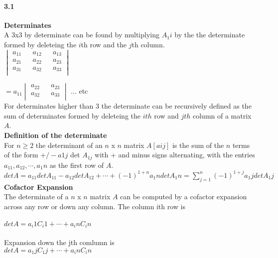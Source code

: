 \documentclass[14pt]{extreport}
\begin{document}
\paragraph{3.1} \textbf{Determinates}\\

A 3x3 by determinate can be found by multiplying $A_1i$ by the the determinate formed by deleteing the $i$th row and the
$j$th column.\\

$
\begin{vmatrix}
	a_{11} && a_{12} && a_{13} \\
	a_{21} && a_{22} && a_{23} \\
	a_{31} && a_{32} && a_{33} \\
\end{vmatrix}
$

$= a_{11} \begin{vmatrix}
	a_{22} && a_{23} \\
	a_{32} && a_{33} \\
\end{vmatrix}
$ ... etc\\

For determinates higher than 3 the determinate can be recursively defined as the sum of determinates formed by deleteing the $ith$ row and $jth$ column of a matrix $A$.\\

\textbf{Definition of the determinate}\\
For $n \ge 2$ the determinant of an $n$ x $n$ matrix $A [aij]$ is the sum of the $n$ terms of the form $+/- a1j$ det $A_{1j}$ with + and minus signs alternating, with the entries $a_11, a_12, \cdots, a_1n$ as the first row of $A$.\\

$det A = a_11 det A_11 - a_12detA_12 + \cdots + (-1)^{1+n}a_1ndet{A_1n} = \sum_{j=1}^{n} (-1)^{1+j}a_1jdetA_1j$\\

\textbf{Cofactor Expansion}\\

The determinate of a $n$ x $n$ matrix $A$ can be computed by a cofactor expansion across any row or down any column.
The column ith row is\\\\

$det A = a_i1C_i1 + \cdots + a_inC_in$\\\\

Expansion down the jth comlumn is\\
$det A = a_1jC_1j + \cdots + a_inC_in$\\\\
\end{document}
